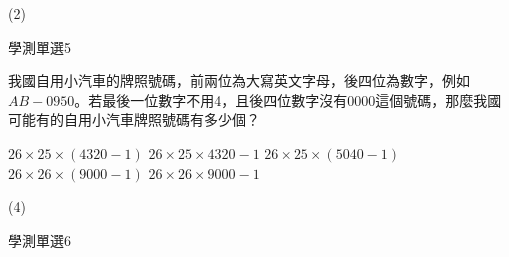 \begin{QUESTIONS}
\begin{QUESTION}
\begin{QBODY}
        \end{QBODY}
        \begin{QFROMS}
        \end{QFROMS}
        \begin{QTAGS}\end{QTAGS}
        \begin{QANS}
            (2)
        \end{QANS}
        \begin{QSOLLIST}
        \end{QSOLLIST}
        \begin{QEMPTYSPACE}
        \end{QEMPTYSPACE}
    \end{QUESTION}
    \begin{QUESTION}
        \begin{ExamInfo}{84}{學測}{單選}{5}
        \end{ExamInfo}
        \begin{ExamAnsRateInfo}{}{}{}{}
        \end{ExamAnsRateInfo}
        \begin{QBODY}
            我國自用小汽車的牌照號碼，前兩位為大寫英文字母，後四位為數字，例如$AB-0950$。若最後一位數字不用4，且後四位數字沒有0000這個號碼，那麼我國可能有的自用小汽車牌照號碼有多少個？
            \begin{QOPS}
            \QOP $26\times 25\times \left( 4320-1 \right)$
            \QOP $ 26\times 25\times 4320-1$ 
            \QOP $26\times 25\times \left( 5040-1 \right)$
            \QOP $26\times 26\times \left( 9000-1 \right)$
            \QOP $26\times 26\times 9000-1$
        \end{QOPS}
        \end{QBODY}
        \begin{QFROMS}
        \end{QFROMS}
        \begin{QTAGS}\end{QTAGS}
        \begin{QANS}
            (4)
        \end{QANS}
        \begin{QSOLLIST}
        \end{QSOLLIST}
        \begin{QEMPTYSPACE}
        \end{QEMPTYSPACE}
    \end{QUESTION}
    \begin{QUESTION}
        \begin{ExamInfo}{84}{學測}{單選}{6}

\end{ExamInfo}
\end{QUESTION}
\end{QUESTIONS}
